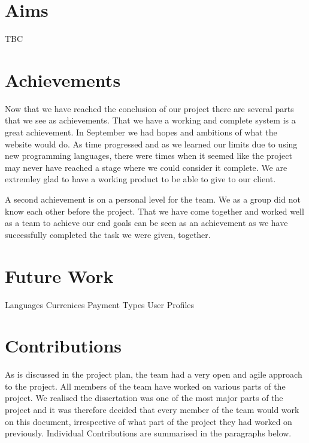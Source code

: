 \documentclass{l3proj}
\begin{document}
\section{Aims}
\label{sect:aims}
TBC

\section{Achievements}
\label{sect:achv}
Now that we have reached the conclusion of our project there are several parts that we see as achievements.
That we have a working and complete system is a great achievement. In September we had hopes
and ambitions of what the website would do. As time progressed and as we learned our limits due to using new
programming languages, there were times when it seemed like the project may never have reached a stage where 
we could consider it complete. We are extremley glad to have a working product to be able to give to our client.

A second achievement is on a personal level for the team. We as a group did not know each other before the project.
That we have come together and worked well as a team to achieve our end goals can be seen as an achievement as we have
successfully completed the task we were given, together.

\section{Future Work}
\label{sect:fut-work}
Languages
Currenices
Payment Types
User Profiles
\section{Contributions}
\label{sec:contrib}
As is discussed in the project plan, the team had a very open and agile approach to the project.
All members of the team have worked on various parts of the project. 
We realised the dissertation was one of the most major parts of the project and it was therefore decided that
every member of the team would work on this document, irrespective of what part of the project they had worked on previously.
Individual Contributions are summarised in the paragraphs below.
\end{document}
